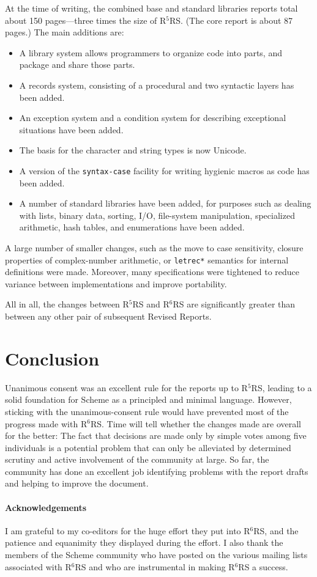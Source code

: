 \documentclass{sigplanconf}
\newcommand{\rn}[1]{R$^{#1}$RS}
\begin{document}
At the time of writing, the combined base and standard
libraries reports total about 150 pages---three times the size
of \rn{5}.  (The core report is about 87 pages.)  The main additions
are:
%
\begin{itemize}
\item A library system allows programmers to organize code into parts,
  and package and share those parts.
\item A records system, consisting of a procedural and two syntactic
  layers has been added.
\item An exception system and a condition system for describing
  exceptional situations have been added.
\item The basis for the character and string types is now Unicode.
\item A version of the \texttt{syntax-case} facility for writing
  hygienic macros as code has been added.
\item A number of standard libraries have been added, for purposes
  such as dealing with lists, binary data, sorting, I/O, file-system
  manipulation, specialized arithmetic, hash tables, and enumerations
  have been added.
\end{itemize}
%
A large number of smaller changes, such as the move to case
sensitivity, closure properties of complex-number arithmetic, or
\texttt{letrec*} semantics for internal definitions were made.
Moreover, many specifications were tightened to reduce variance
between implementations and improve portability.

All in all, the changes between \rn{5} and \rn{6} are significantly
greater than between any other pair of subsequent Revised
Reports.

\section{Conclusion}
\label{sec:conclusion}

Unanimous consent was an excellent rule for the reports up to \rn{5},
leading to a solid foundation for Scheme as a principled and minimal
language.  However, sticking with the unanimous-consent rule would
have prevented most of the progress made with \rn{6}.  Time will tell
whether the changes made are overall for the better: The fact that
decisions are made only by simple votes among five individuals is a
potential problem that can only be alleviated by determined scrutiny
and active involvement of the community at large.  So far, the
community has done an excellent job identifying problems with the
report drafts and helping to improve the document.

\paragraph*{Acknowledgements} I am grateful to my co-editors for the
huge effort they put into \rn{6}, and the patience and equanimity they
displayed during the effort.  I also thank the members of the Scheme
community who have posted on the various mailing lists associated with
\rn{6} and who are instrumental in making \rn{6} a success.



\end{document}
